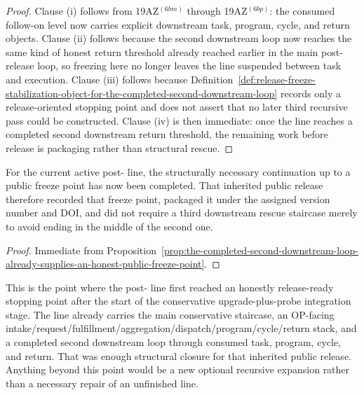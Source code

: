 \begin{proof}
Clause (i) follows from 19AZ$^{(6bm)}$ through 19AZ$^{(6bp)}$: the consumed follow-on level now carries explicit downstream task, program, cycle, and return objects. Clause (ii) follows because the second downstream loop now reaches the same kind of honest return threshold already reached earlier in the main post-release loop, so freezing here no longer leaves the line suspended between task and execution. Clause (iii) follows because Definition~\ref{def:release-freeze-stabilization-object-for-the-completed-second-downstream-loop} records only a release-oriented stopping point and does not assert that no later third recursive pass could be constructed. Clause (iv) is then immediate: once the line reaches a completed second downstream return threshold, the remaining work before release is packaging rather than structural rescue.
\end{proof}

\begin{corollary}
\label{cor:the-next-public-version-now-needs-doi-and-audit-rather-than-another-mandatory-rescue-staircase}
For the current active post- line, the structurally necessary continuation up to a public freeze point has now been completed. That inherited public release therefore recorded that freeze point, packaged it under the assigned version number and DOI, and did not require a third downstream rescue staircase merely to avoid ending in the middle of the second one.
\end{corollary}

\begin{proof}
Immediate from Proposition~\ref{prop:the-completed-second-downstream-loop-already-supplies-an-honest-public-freeze-point}.
\end{proof}

\begin{remark}
\label{rem:what-the-release-freeze-stabilization-point-now-buys}
This is the point where the post- line first reached an honestly release-ready stopping point after the start of the conservative upgrade-plus-probe integration stage. The line already carries the main conservative staircase, an OP-facing intake/request/fulfillment/aggregation/dispatch/program/cycle/return stack, and a completed second downstream loop through consumed task, program, cycle, and return. That was enough structural closure for that inherited public release. Anything beyond this point would be a new optional recursive expansion rather than a necessary repair of an unfinished line.
\end{remark}

